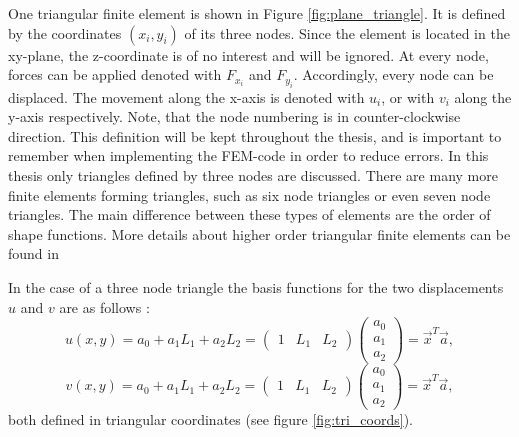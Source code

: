   One triangular finite element is shown in Figure \ref{fig:plane_triangle}. It is defined by the coordinates $(x_i,y_i)$ of its three nodes. Since the element is located in the xy-plane, the z-coordinate is of no interest and will be ignored. At every node, forces can be applied denoted with $F_{x_i}$ and $F_{y_i}$. Accordingly, every node can be displaced. The movement along the x-axis is denoted with $u_i$, or with $v_i$ along the y-axis respectively. Note, that the node numbering is in counter-clockwise direction. This definition will be kept throughout the thesis, and is important to remember when implementing the FEM-code in order to reduce errors.
  In this thesis only triangles defined by three nodes are discussed. There are many more finite elements forming triangles, such as six node triangles or even seven node triangles. The main difference between these types of elements are the order of shape functions. More details about higher order triangular finite elements can be found in %
  
  In the case of a three node triangle the basis functions for the two displacements $u$ and $v$ are as follows \cite{steinke2005finite}:
  \begin{equation}\label{eq:t3_ansatzU}
  u(x,y) = a_0 + a_1L_1 + a_2L_2 = \begin{pmatrix}
  1 & L_1 & L_2
  \end{pmatrix} \begin{pmatrix}
  a_0 \\ a_1 \\ a_2
  \end{pmatrix} = \vec{x}^T \vec{a},
  \end{equation}
  \begin{equation}\label{eq:t3_ansatzV}
  v(x,y) = a_0 + a_1L_1 + a_2L_2 = \begin{pmatrix}
  1 & L_1 & L_2
  \end{pmatrix} \begin{pmatrix}
  a_0 \\ a_1 \\ a_2
  \end{pmatrix} = \vec{x}^T \vec{a},
  \end{equation}
  both defined in triangular coordinates (see figure \ref{fig:tri_coords}).
  
